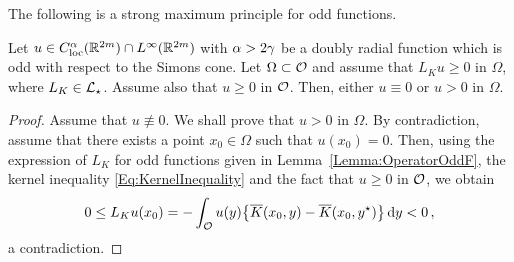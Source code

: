 The following is a strong maximum principle for odd functions.

\begin{proposition}
\label{Prop:StrongMaximumPrincipleForOddFunctions} Let $u\in C^{\alpha}_{\mathrm{loc}}(\mathbb{R}^{2m})\cap L^\infty(\mathbb{R}^{2m})$ with $\alpha > 2\gamma$ be a doubly radial function which is odd with respect to the Simons cone. Let $\Omega \subset \mathcal{O}$ and assume that $L_K u \geq 0$ in $\Omega$, where $L_K  \in \mathcal{L}_\star$. Assume also that $u\geq 0$ in $\mathcal{O}$. Then, either $u\equiv 0$ or $u > 0$ in $\Omega$.
\end{proposition}

\begin{proof}
Assume that $u \not \equiv 0$. We shall prove that $u > 0$ in $\Omega$. By contradiction, assume that there exists a point $x_0\in \Omega$ such that $u(x_0)= 0$. Then, using the expression of $L_K $ for odd functions given in Lemma~\ref{Lemma:OperatorOddF}, the kernel inequality \eqref{Eq:KernelInequality} and the fact that $u\geq 0$ in $\mathcal{O}$, we obtain
$$
0 \leq L_K u(x_0) = - \int_{\mathcal{O}} u(y)\big \{\overline{K}(x_0, y) - \overline{K}(x_0, y^\star) \big \}\,\mathrm{d} y < 0\,,
$$
a contradiction.
\end{proof}


